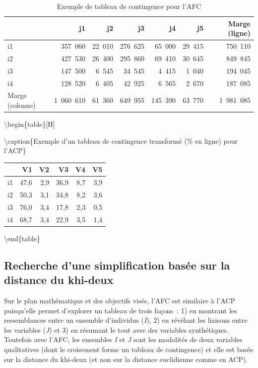 \documentclass[
  11pt,
  french,
]{book}
\begin{document}
\begin{table}[H]

\caption{\label{tab:encadreAFCACP1}Exemple de tableau de contingence pour l'AFC}
\centering
\fontsize{8}{10}\selectfont
\begin{tabular}[t]{lrrrrrr}
\toprule
  & j1 & j2 & j3 & j4 & j5 & Marge (ligne)\\
\midrule
i1 & 357 060 & 22 010 & 276 625 & 65 000 & 29 415 & 750 110\\
i2 & 427 530 & 26 400 & 295 860 & 69 410 & 30 645 & 849 845\\
i3 & 147 500 & 6 545 & 34 545 & 4 415 & 1 040 & 194 045\\
i4 & 128 520 & 6 405 & 42 925 & 6 565 & 2 670 & 187 085\\
Marge (colonne) & 1 060 610 & 61 360 & 649 955 & 145 390 & 63 770 & 1 981 085\\
\bottomrule
\end{tabular}
\end{table}

\textbackslash begin\{table\}{[}H{]}

\textbackslash caption\{\label{tab:encadreAFCACP2}Exemple d'un tableau de contingence transformé (\% en ligne) pour l'ACP\}
\centering
\fontsize{8}{10}\selectfont

\begin{tabular}[t]{lrrrrr}
\toprule
  & V1 & V2 & V3 & V4 & V5\\
\midrule
i1 & 47,6 & 2,9 & 36,9 & 8,7 & 3,9\\
i2 & 50,3 & 3,1 & 34,8 & 8,2 & 3,6\\
i3 & 76,0 & 3,4 & 17,8 & 2,3 & 0,5\\
i4 & 68,7 & 3,4 & 22,9 & 3,5 & 1,4\\
\bottomrule
\end{tabular}

\textbackslash end\{table\}

\hypertarget{sect1231}{%
\subsection{Recherche d'une simplification basée sur la distance du khi-deux}\label{sect1231}}

Sur le plan mathématique et des objectifs visés, l'AFC est similaire à l'ACP puisqu'elle permet d'explorer un tableau de trois façons~: 1) en montrant les ressemblances entre un ensemble d'individus (\emph{I}), 2) en révélant les liaisons entre les variables (\emph{J}) et 3) en résumant le tout avec des variables synthétiques. Toutefois avec l'AFC, les ensembles \emph{I} et \emph{J} sont les modalités de deux variables qualitatives (dont le croisement forme un tableau de contingence) et elle est basée sur la distance du khi-deux (et non sur la distance euclidienne comme en ACP).
\end{document}
